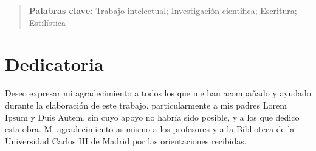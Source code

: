 \documentclass[12pt]{report} %
\begin{document}
\newpage %
\thispagestyle{empty}
\mbox{}

\renewcommand\abstractname{\large\bfseries\filcenter\uppercase{Resumen}}
\begin{abstract}
\thispagestyle{plain}
\setcounter{page}{3}
	
	\lipsum[1-3]
	
	\textbf{Palabras clave:}
	Trabajo intelectual; Investigación científica; Escritura; Estilística
	
	\vfill
\end{abstract}
	\newpage %
	\thispagestyle{empty}
	\mbox{}


\chapter*{Dedicatoria}

\setcounter{page}{5}
	
	Deseo expresar mi agradecimiento a todos los que me han acompañado y ayudado durante la elaboración de este trabajo, particularmente a mis padres Lorem Ipsum y Duis Autem,
	sin cuyo apoyo no habría sido posible, y a los que dedico esta obra. Mi agradecimiento asimismo a los profesores y a la Biblioteca de la Universidad Carlos III de Madrid por las 
	orientaciones recibidas.	
		
	\vfill
	
	\newpage %
	\thispagestyle{empty}
	\mbox{}
	


\tableofcontents
\thispagestyle{fancy}

\newpage %
\thispagestyle{empty}
\mbox{}

\listoffigures
\thispagestyle{fancy}

\newpage %
\thispagestyle{empty}
\mbox{}

\listoftables
\thispagestyle{fancy}

\newpage %
\thispagestyle{empty}
\mbox{}


\clearpage
{} %
\end{document}
